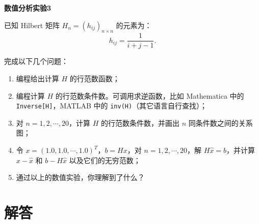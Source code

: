 \documentclass{article}
\begin{document}
\begin{center}
      { \textbf{数值分析实验3}}
\end{center}

\vspace{0.3cm} %

已知 Hilbert 矩阵 \( H_n = (h_{ij})_{n \times n} \) 的元素为：
\[
      h_{ij} = \frac{1}{i + j - 1}.
\]

完成以下几个问题：

\begin{enumerate}[itemsep=0.7em] %
      \item 编程给出计算 \( H \) 的行范数函数；
      \item 编程计算 \( H \) 的行范数条件数。可调用求逆函数，比如 Mathematica 中的 \texttt{Inverse[H]}，MATLAB 中的 \texttt{inv(H)}（其它语言自行查找）；
      \item 对 \( n = 1, 2, \cdots, 20 \)，计算 \( H \) 的行范数条件数，并画出 \( n \) 同条件数之间的关系图；
      \item 令 \( x = (1.0, 1.0, \cdots, 1.0)^T \)，\( b = Hx \)，对 \( n = 1, 2, \cdots, 20 \)，解 \( H \hat{x} = b \)，并计算 \( x - \hat{x} \) 和 \( b - H \hat{x} \) 以及它们的无穷范数；
      \item 通过以上的数值实验，你理解到了什么？
\end{enumerate}

\newpage
\section*{解答}
\end{document}
